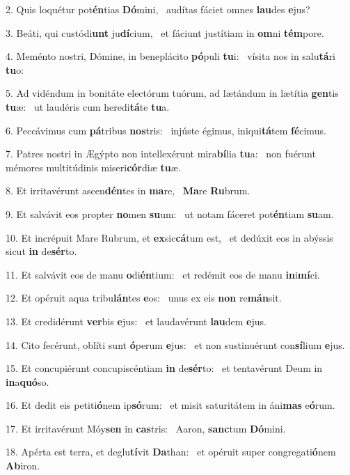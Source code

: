 2. Quis loquétur pot\textbf{én}tias \textbf{Dó}mini, \ast\  audítas fáciet omnes \textbf{lau}des \textbf{e}jus?\

3. Beáti, qui custódi\textbf{unt} ju\textbf{dí}cium, \ast\  et fáciunt justítiam in \textbf{om}ni \textbf{tém}pore.\

4. Meménto nostri, Dómine, in beneplácito \textbf{pó}puli \textbf{tu}i: \ast\  vísita nos in salu\textbf{tá}ri \textbf{tu}o:\

5. Ad vidéndum in bonitáte electórum tuórum, ad lætándum in lætítia \textbf{gen}tis \textbf{tu}æ: \ast\  ut laudéris cum heredi\textbf{tá}te \textbf{tu}a.\

6. Peccávimus cum \textbf{pá}tribus \textbf{nos}tris: \ast\  injúste égimus, iniqui\textbf{tá}tem \textbf{fé}cimus.\

7. Patres nostri in Ægýpto non intellexérunt mira\textbf{bí}lia \textbf{tu}a: \ast\  non fuérunt mémores multitúdinis miseri\textbf{cór}diæ \textbf{tu}æ.\

8. Et irritavérunt ascen\textbf{dén}tes in \textbf{ma}re, \ast\  \textbf{Ma}re \textbf{Ru}brum.\

9. Et salvávit eos propter \textbf{no}men \textbf{su}um: \ast\  ut notam fáceret pot\textbf{én}tiam \textbf{su}am.\

10. Et incrépuit Mare Rubrum, et \textbf{ex}sic\textbf{cá}tum est, \ast\  et dedúxit eos in abýssis sicut \textbf{in} de\textbf{sér}to.\

11. Et salvávit eos de manu \textbf{o}di\textbf{én}tium: \ast\  et redémit eos de manu \textbf{in}i\textbf{mí}ci.\

12. Et opéruit aqua tribu\textbf{lán}tes \textbf{e}os: \ast\  unus ex eis \textbf{non} re\textbf{mán}sit.\

13. Et credidérunt \textbf{ver}bis \textbf{e}jus: \ast\  et laudavérunt \textbf{lau}dem \textbf{e}jus.\

14. Cito fecérunt, oblíti sunt \textbf{ó}perum \textbf{e}jus: \ast\  et non sustinuérunt con\textbf{sí}lium \textbf{e}jus.\

15. Et concupiérunt concupiscéntiam \textbf{in} de\textbf{sér}to: \ast\  et tentavérunt Deum in \textbf{in}a\textbf{quó}so.\

16. Et dedit eis petiti\textbf{ó}nem ip\textbf{só}rum: \ast\  et misit saturitátem in áni\textbf{mas} e\textbf{ó}rum.\

17. Et irritavérunt Móy\textbf{sen} in \textbf{cas}tris: \ast\  Aaron, \textbf{sanc}tum \textbf{Dó}mini.\

18. Apérta est terra, et deglu\textbf{tí}vit \textbf{Da}than: \ast\  et opéruit super congregati\textbf{ó}nem \textbf{Ab}iron.\

